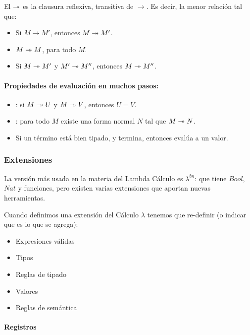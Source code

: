 \noindent
El  $\twoheadrightarrow$ es la clausura reflexiva, transitiva de $\to$. Es decir, la menor relación tal que:

\begin{itemize}
  \item Si $M\to M'$, entonces $M\twoheadrightarrow M'$.
  \item $M\twoheadrightarrow M$, para todo $M$.
  \item Si $M \twoheadrightarrow M'$ y $M' \twoheadrightarrow M''$, entonces $M \twoheadrightarrow M''$.
\end{itemize}

\paragraph{Propiedades de evaluación en muchos pasos:}

\begin{itemize}
  \item {}: si $M \twoheadrightarrow U$ y $M \twoheadrightarrow V$, entonces $U=V$.
  \item {}: para todo $M$ existe una forma normal $N$ tal que $M \twoheadrightarrow N$.
  \item Si un término está bien tipado, y termina, entonces evalúa a un valor.
\end{itemize}

\subsubsection{Extensiones}

La versión más usada en la materia del Lambda Cálculo es $\lambda^{bn}$: que tiene $Bool$, $Nat$ y funciones, pero existen varias extensiones que aportan nuevas herramientas.

Cuando definimos una extensión del Cálculo $\lambda$ tenemos que re-definir (o indicar que es lo que se agrega):
\begin{itemize}
  \item Expresiones válidas
  \item Tipos
  \item Reglas de tipado
  \item Valores
  \item Reglas de semántica
\end{itemize}

\paragraph{Registros}

